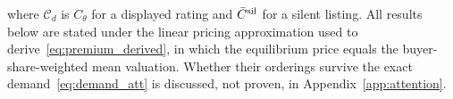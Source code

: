 where $\mathcal C_d$ is $C_\theta$ for a displayed rating and $\bar C^{\rm sil}$ for a silent listing. All results below are stated under the linear pricing approximation used to derive~\eqref{eq:premium_derived}, in which the equilibrium price equals the buyer-share-weighted mean valuation. Whether their orderings survive the exact demand~\eqref{eq:demand_att} is discussed, not proven, in Appendix~\ref{app:attention}.
